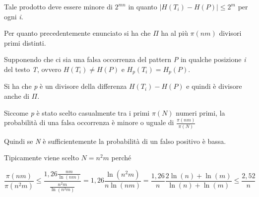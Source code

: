 Tale prodotto deve essere minore di $2^{mn}$ in quanto $\big|H(T_i) - H(P)\big| \leq 2^m$ per ogni
\emph{i}.

Per quanto precedentemente enunciato si ha che $ \Pi $ ha al più
$\pi(nm)$ divisori primi distinti.

Supponendo che ci sia una falsa occorrenza del pattern \emph{P} in
qualche posizione \emph{i} del testo \emph{T}, ovvero $H(T_i) \neq
H(P)$ e $H_p(T_i) = H_p(P)$.

Si ha che \emph{p} è un divisore della differenza $H(T_i) - H(P)$ e
quindi è divisore anche di $ \Pi $.

Siccome \emph{p} è stato scelto casualmente tra i primi $\pi(N)$
numeri primi, la probabilità di una falsa occorrenza è minore o uguale
di $\frac{\pi (nm)}{\pi (N)}$

Quindi se \emph{N} è sufficientemente la probabilità di un falso
positivo è bassa.

Tipicamente viene scelto $N = n^2m$ perché

$$
\frac{\pi (nm)}{\pi (n^2m)} \leq \frac{1,26 \frac{nm}{\ln (nm)}}{ \frac{n^2 m}{\ln (n^2 m)}} = 1,26 \frac{\ln (n^2 m) }{n \ln(nm)} = \frac{1,26}{n} \frac{ 2\ln (n) + \ln (m)}{\ln (n) + \ln (m)} \leq \frac{2,52}{n}
$$
